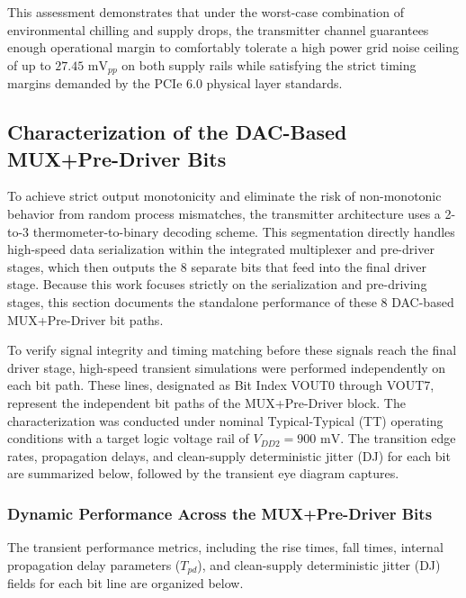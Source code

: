 This assessment demonstrates that under the worst-case combination of environmental chilling and supply drops, the transmitter channel guarantees enough operational margin to comfortably tolerate a high power grid noise ceiling of up to $27.45\text{ mV}_{pp}$ on both supply rails while satisfying the strict timing margins demanded by the PCIe 6.0 physical layer standards.

\clearpage

\subsection{Characterization of the DAC-Based MUX+Pre-Driver Bits}
\label{subsec:dac_based_mux_predriver_bits}
To achieve strict output monotonicity and eliminate the risk of non-monotonic behavior from random process mismatches, the transmitter architecture uses a 2-to-3 thermometer-to-binary decoding scheme. This segmentation directly handles high-speed data serialization within the integrated multiplexer and pre-driver stages, which then outputs the 8 separate bits that feed into the final driver stage. Because this work focuses strictly on the serialization and pre-driving stages, this section documents the standalone performance of these 8 DAC-based MUX+Pre-Driver bit paths.

To verify signal integrity and timing matching before these signals reach the final driver stage, high-speed transient simulations were performed independently on each bit path. These lines, designated as Bit Index VOUT0 through VOUT7, represent the independent bit paths of the MUX+Pre-Driver block. The characterization was conducted under nominal Typical-Typical (TT) operating conditions with a target logic voltage rail of $V_{DD2} = 900\text{ mV}$. The transition edge rates, propagation delays, and clean-supply deterministic jitter (DJ) for each bit are summarized below, followed by the transient eye diagram captures.

\subsubsection*{Dynamic Performance Across the MUX+Pre-Driver Bits}

The transient performance metrics, including the rise times, fall times, internal propagation delay parameters ($T_{pd}$), and clean-supply deterministic jitter (DJ) fields for each bit line are organized below.

